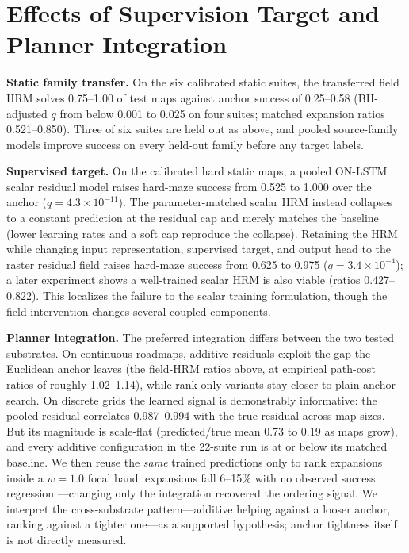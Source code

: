 \documentclass[letterpaper]{article} %
\begin{document}
\section{Effects of Supervision Target and Planner Integration}

\textbf{Static family transfer.} On the six calibrated static suites, the transferred field HRM solves 0.75--1.00 of test maps against anchor success of 0.25--0.58 (BH-adjusted $q$ from below 0.001 to 0.025 on four suites; matched expansion ratios 0.521--0.850). Three of six suites are held out as above, and pooled source-family models improve success on every held-out family before any target labels.

\textbf{Supervised target.} On the calibrated hard static maps, a pooled ON-LSTM scalar residual model raises hard-maze success from 0.525 to 1.000 over the anchor ($q=4.3\times10^{-11}$). The parameter-matched scalar HRM instead collapses to a constant prediction at the residual cap and merely matches the baseline (lower learning rates and a soft cap reproduce the collapse). Retaining the HRM while changing input representation, supervised target, and output head to the raster residual field raises hard-maze success from 0.625 to 0.975 ($q=3.4\times10^{-4}$); a later experiment shows a well-trained scalar HRM is also viable (ratios 0.427--0.822). This localizes the failure to the scalar training formulation, though the field intervention changes several coupled components.

\textbf{Planner integration.} The preferred integration differs between the two tested substrates. On continuous roadmaps, additive residuals exploit the gap the Euclidean anchor leaves (the field-HRM ratios above, at empirical path-cost ratios of roughly 1.02--1.14), while rank-only variants stay closer to plain anchor search. On discrete grids the learned signal is demonstrably informative: the pooled residual correlates 0.987--0.994 with the true residual across map sizes. But its magnitude is scale-flat (predicted/true mean 0.73 to 0.19 as maps grow), and every additive configuration in the 22-suite run is at or below its matched baseline. We then reuse the \emph{same} trained predictions only to rank expansions inside a $w{=}1.0$ focal band: expansions fall 6--15\% with no observed success regression \citep{chrestien2023rank}---changing only the integration recovered the ordering signal. We interpret the cross-substrate pattern---additive helping against a looser anchor, ranking against a tighter one---as a supported hypothesis; anchor tightness itself is not directly measured.
\end{document}
